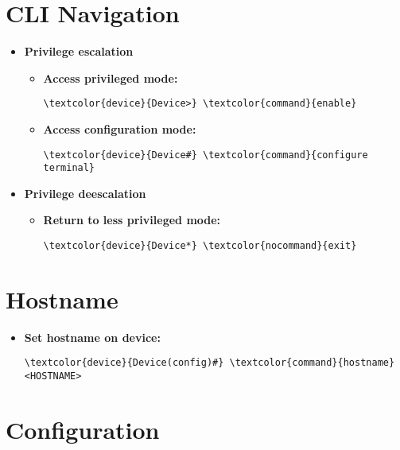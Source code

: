 \documentclass[10pt, a4paper, onecolumn, oneside, titlepage, openany]{book}
\begin{document}
\section{CLI Navigation}
\begin{itemize}
    \item \textbf{Privilege escalation}
    \begin{itemize}
        \item \textbf{Access privileged mode:}
\begin{Verbatim}[commandchars=\\\{\}]
\textcolor{device}{Device>} \textcolor{command}{enable}
\end{Verbatim}
        \item \textbf{Access configuration mode:}
\begin{Verbatim}[commandchars=\\\{\}]
\textcolor{device}{Device#} \textcolor{command}{configure terminal}
\end{Verbatim}
    \end{itemize}
    \item \textbf{Privilege deescalation}
    \begin{itemize}
        \item \textbf{Return to less privileged mode:}
\begin{Verbatim}[commandchars=\\\{\}]
\textcolor{device}{Device*} \textcolor{nocommand}{exit}
\end{Verbatim}
    \end{itemize}
\end{itemize}

\section{Hostname}
\label{hostname}
\begin{itemize}
    \item \textbf{Set hostname on device:}
\begin{Verbatim}[commandchars=\\\{\}]
\textcolor{device}{Device(config)#} \textcolor{command}{hostname} <HOSTNAME>
\end{Verbatim}
\end{itemize}

\section{Configuration}
\end{document}
